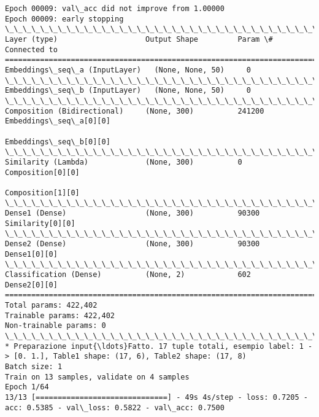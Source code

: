 \documentclass[11pt]{article}
\begin{document}
\begin{Verbatim}[commandchars=\\\{\}]
Epoch 00009: val\_acc did not improve from 1.00000
Epoch 00009: early stopping
\_\_\_\_\_\_\_\_\_\_\_\_\_\_\_\_\_\_\_\_\_\_\_\_\_\_\_\_\_\_\_\_\_\_\_\_\_\_\_\_\_\_\_\_\_\_\_\_\_\_\_\_\_\_\_\_\_\_\_\_\_\_\_\_\_\_\_\_\_\_\_\_\_\_\_\_\_\_\_\_\_\_\_\_\_\_\_\_\_\_\_\_\_\_\_\_\_\_
Layer (type)                    Output Shape         Param \#     Connected to                     
==================================================================================================
Embeddings\_seq\_a (InputLayer)   (None, None, 50)     0                                            
\_\_\_\_\_\_\_\_\_\_\_\_\_\_\_\_\_\_\_\_\_\_\_\_\_\_\_\_\_\_\_\_\_\_\_\_\_\_\_\_\_\_\_\_\_\_\_\_\_\_\_\_\_\_\_\_\_\_\_\_\_\_\_\_\_\_\_\_\_\_\_\_\_\_\_\_\_\_\_\_\_\_\_\_\_\_\_\_\_\_\_\_\_\_\_\_\_\_
Embeddings\_seq\_b (InputLayer)   (None, None, 50)     0                                            
\_\_\_\_\_\_\_\_\_\_\_\_\_\_\_\_\_\_\_\_\_\_\_\_\_\_\_\_\_\_\_\_\_\_\_\_\_\_\_\_\_\_\_\_\_\_\_\_\_\_\_\_\_\_\_\_\_\_\_\_\_\_\_\_\_\_\_\_\_\_\_\_\_\_\_\_\_\_\_\_\_\_\_\_\_\_\_\_\_\_\_\_\_\_\_\_\_\_
Composition (Bidirectional)     (None, 300)          241200      Embeddings\_seq\_a[0][0]           
                                                                 Embeddings\_seq\_b[0][0]           
\_\_\_\_\_\_\_\_\_\_\_\_\_\_\_\_\_\_\_\_\_\_\_\_\_\_\_\_\_\_\_\_\_\_\_\_\_\_\_\_\_\_\_\_\_\_\_\_\_\_\_\_\_\_\_\_\_\_\_\_\_\_\_\_\_\_\_\_\_\_\_\_\_\_\_\_\_\_\_\_\_\_\_\_\_\_\_\_\_\_\_\_\_\_\_\_\_\_
Similarity (Lambda)             (None, 300)          0           Composition[0][0]                
                                                                 Composition[1][0]                
\_\_\_\_\_\_\_\_\_\_\_\_\_\_\_\_\_\_\_\_\_\_\_\_\_\_\_\_\_\_\_\_\_\_\_\_\_\_\_\_\_\_\_\_\_\_\_\_\_\_\_\_\_\_\_\_\_\_\_\_\_\_\_\_\_\_\_\_\_\_\_\_\_\_\_\_\_\_\_\_\_\_\_\_\_\_\_\_\_\_\_\_\_\_\_\_\_\_
Dense1 (Dense)                  (None, 300)          90300       Similarity[0][0]                 
\_\_\_\_\_\_\_\_\_\_\_\_\_\_\_\_\_\_\_\_\_\_\_\_\_\_\_\_\_\_\_\_\_\_\_\_\_\_\_\_\_\_\_\_\_\_\_\_\_\_\_\_\_\_\_\_\_\_\_\_\_\_\_\_\_\_\_\_\_\_\_\_\_\_\_\_\_\_\_\_\_\_\_\_\_\_\_\_\_\_\_\_\_\_\_\_\_\_
Dense2 (Dense)                  (None, 300)          90300       Dense1[0][0]                     
\_\_\_\_\_\_\_\_\_\_\_\_\_\_\_\_\_\_\_\_\_\_\_\_\_\_\_\_\_\_\_\_\_\_\_\_\_\_\_\_\_\_\_\_\_\_\_\_\_\_\_\_\_\_\_\_\_\_\_\_\_\_\_\_\_\_\_\_\_\_\_\_\_\_\_\_\_\_\_\_\_\_\_\_\_\_\_\_\_\_\_\_\_\_\_\_\_\_
Classification (Dense)          (None, 2)            602         Dense2[0][0]                     
==================================================================================================
Total params: 422,402
Trainable params: 422,402
Non-trainable params: 0
\_\_\_\_\_\_\_\_\_\_\_\_\_\_\_\_\_\_\_\_\_\_\_\_\_\_\_\_\_\_\_\_\_\_\_\_\_\_\_\_\_\_\_\_\_\_\_\_\_\_\_\_\_\_\_\_\_\_\_\_\_\_\_\_\_\_\_\_\_\_\_\_\_\_\_\_\_\_\_\_\_\_\_\_\_\_\_\_\_\_\_\_\_\_\_\_\_\_
* Preparazione input{\ldots}Fatto. 17 tuple totali, esempio label: 1 -> [0. 1.], Table1 shape: (17, 6), Table2 shape: (17, 8)
Batch size: 1
Train on 13 samples, validate on 4 samples
Epoch 1/64
13/13 [==============================] - 49s 4s/step - loss: 0.7205 - acc: 0.5385 - val\_loss: 0.5822 - val\_acc: 0.7500


\end{Verbatim}
\end{document}
